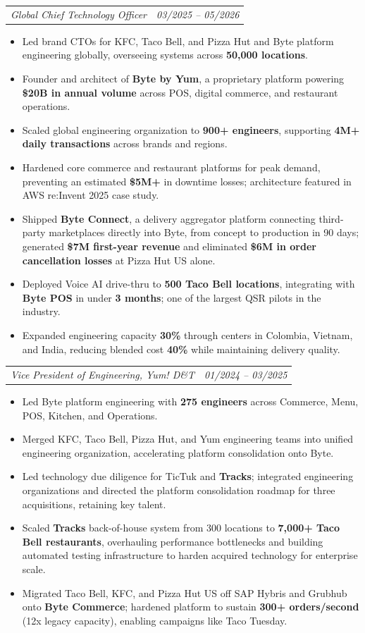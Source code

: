 \documentclass[letterpaper,11pt]{article}
\makeatletter
\newcommand{\resumeItem}[1]{
  \item\small{#1}
}
\newcommand{\resumeRole}[2]{
    \vspace{4pt}
    \begin{tabular*}{0.97\textwidth}{l@{\extracolsep{\fill}}r}
      \textit{\small#1} & \textit{\small #2} \\
    \end{tabular*}\vspace{-5pt}
}
\newcommand{\resumeItemListStart}{\begin{itemize}}
\newcommand{\resumeItemListEnd}{\end{itemize}\vspace{-5pt}}
\makeatother
\begin{document}
    \resumeRole{Global Chief Technology Officer}{03/2025 -- 05/2026}
      \resumeItemListStart
        \resumeItem{Led brand CTOs for KFC, Taco Bell, and Pizza Hut and Byte platform engineering globally, overseeing systems across \textbf{50,000 locations}.}
        \resumeItem{Founder and architect of \textbf{Byte by Yum}, a proprietary platform powering \textbf{\$20B in annual volume} across POS, digital commerce, and restaurant operations.}
        \resumeItem{Scaled global engineering organization to \textbf{900+ engineers}, supporting \textbf{4M+ daily transactions} across brands and regions.}
        \resumeItem{Hardened core commerce and restaurant platforms for peak demand, preventing an estimated \textbf{\$5M+} in downtime losses; architecture featured in AWS re:Invent 2025 case study.}
        \resumeItem{Shipped \textbf{Byte Connect}, a delivery aggregator platform connecting third-party marketplaces directly into Byte, from concept to production in 90 days; generated \textbf{\$7M first-year revenue} and eliminated \textbf{\$6M in order cancellation losses} at Pizza Hut US alone.}
        \resumeItem{Deployed Voice AI drive-thru to \textbf{500 Taco Bell locations}, integrating with \textbf{Byte POS} in under \textbf{3 months}; one of the largest QSR pilots in the industry.}
        \resumeItem{Expanded engineering capacity \textbf{30\%} through centers in Colombia, Vietnam, and India, reducing blended cost \textbf{40\%} while maintaining delivery quality.}
      \resumeItemListEnd

    \resumeRole{Vice President of Engineering, Yum! D\&T}{01/2024 -- 03/2025}
     \resumeItemListStart
        \resumeItem{Led Byte platform engineering with \textbf{275 engineers} across Commerce, Menu, POS, Kitchen, and Operations.}
        \resumeItem{Merged KFC, Taco Bell, Pizza Hut, and Yum engineering teams into unified engineering organization, accelerating platform consolidation onto Byte.}
        \resumeItem{Led technology due diligence for TicTuk and \textbf{Tracks}; integrated engineering organizations and directed the platform consolidation roadmap for three acquisitions, retaining key talent.}
        \resumeItem{Scaled \textbf{Tracks} back-of-house system from 300 locations to \textbf{7,000+ Taco Bell restaurants}, overhauling performance bottlenecks and building automated testing infrastructure to harden acquired technology for enterprise scale.}
        \resumeItem{Migrated Taco Bell, KFC, and Pizza Hut US off SAP Hybris and Grubhub onto \textbf{Byte Commerce}; hardened platform to sustain \textbf{300+ orders/second} (12x legacy capacity), enabling campaigns like Taco Tuesday.}
     \resumeItemListEnd
\end{document}
